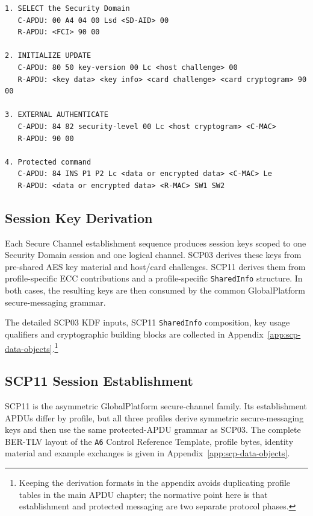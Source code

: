 \begin{verbatim}
1. SELECT the Security Domain
   C-APDU: 00 A4 04 00 Lsd <SD-AID> 00
   R-APDU: <FCI> 90 00

2. INITIALIZE UPDATE
   C-APDU: 80 50 key-version 00 Lc <host challenge> 00
   R-APDU: <key data> <key info> <card challenge> <card cryptogram> 90 00

3. EXTERNAL AUTHENTICATE
   C-APDU: 84 82 security-level 00 Lc <host cryptogram> <C-MAC>
   R-APDU: 90 00

4. Protected command
   C-APDU: 84 INS P1 P2 Lc <data or encrypted data> <C-MAC> Le
   R-APDU: <data or encrypted data> <R-MAC> SW1 SW2
\end{verbatim}

\subsection{Session Key Derivation}

Each Secure Channel establishment sequence produces session keys scoped to one
Security Domain session and one logical channel. SCP03 derives these keys from
pre-shared AES key material and host/card challenges. SCP11 derives them from
profile-specific ECC contributions and a profile-specific \texttt{SharedInfo}
structure. In both cases, the resulting keys are then consumed by the common
GlobalPlatform secure-messaging grammar.

The detailed SCP03 KDF inputs, SCP11 \texttt{SharedInfo} composition, key
usage qualifiers and cryptographic building blocks are collected in
Appendix~\ref{app:scp-data-objects}.\footnote{Keeping the derivation formats in
the appendix avoids duplicating profile tables in the main APDU chapter; the
normative point here is that establishment and protected messaging are two
separate protocol phases.}

\subsection{SCP11 Session Establishment}

SCP11 is the asymmetric GlobalPlatform secure-channel family. Its
establishment APDUs differ by profile, but all three profiles derive symmetric
secure-messaging keys and then use the same protected-APDU grammar as SCP03.
The complete BER-TLV layout of the \texttt{A6} Control Reference Template,
profile bytes, identity material and example exchanges is given in
Appendix~\ref{app:scp-data-objects}.


